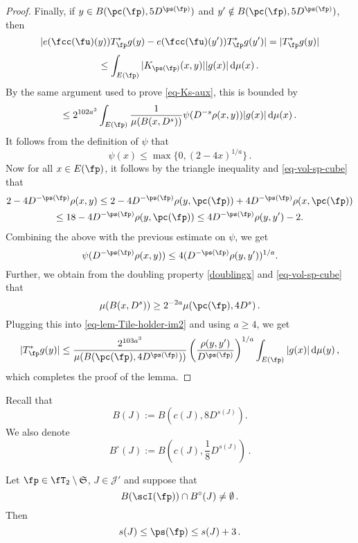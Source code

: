 \begin{proof}
        Finally, if $y \in B(\pc(\fp), 5D^{\ps(\fp)})$ and $y' \notin B(\pc(\fp), 5D^{\ps(\fp)})$, then
        $$
            |e(\fcc(\fu)(y)) T_{\fp}^* g(y) - e(\fcc(\fu)(y')) T_{\fp}^* g(y')| = |T_{\fp}^* g(y)|
        $$
        $$
            \le \int_{E(\fp)} |K_{\ps(\fp)}(x,y)| |g(x)| \, \mathrm{d}\mu(x)\,.
        $$
        By the same argument used to prove \eqref{eq-Ks-aux}, this is bounded by
        \begin{equation}
            \label{eq-lem-Tile-holder-im2}
            \le 2^{102a^3} \int_{E(\fp)} \frac{1}{\mu(B(x, D^s))} \psi(D^{-s} \rho(x,y)) |g(x)| \, \mathrm{d}\mu(x)\,.
        \end{equation}
        It follows from the definition of $\psi$ that
        $$
            \psi(x) \le \max\{0, (2 - 4x)^{1/a}\}\,.
        $$
        Now for all $x\in E(\fp)$, it follows by the triangle inequality and \eqref{eq-vol-sp-cube} that
        \begin{multline*}
        2 - 4D^{-\ps(\fp)}\rho(x,y)\leq 2 - 4D^{-\ps(\fp)}\rho(y, \pc(\fp)) + 4 D^{-\ps(\fp)}\rho(x, \pc(\fp))\\\leq 18 - 4 D^{-\ps(\fp)} \rho(y, \pc(\fp)) \leq 4 D^{-\ps(\fp)}\rho(y,y') - 2 .
        \end{multline*}
        Combining the above with the previous estimate on $\psi$, we get
        $$
            \psi(D^{-\ps(\fp)}\rho(x,y)) \le 4 (D^{-\ps(\fp)}\rho(y,y'))^{1/a}.
        $$
        Further, we obtain from the doubling property \eqref{doublingx} and \eqref{eq-vol-sp-cube} that
        $$
            \mu(B(x, D^s)) \ge 2^{-2a} \mu(\pc(\fp), 4D^s)\,.
        $$
        Plugging this into \eqref{eq-lem-Tile-holder-im2} and using $a \ge 4$, we get
        $$
            |T_{\fp}^* g(y)| \le \frac{2^{103a^3}}{\mu(B(\pc(\fp), 4D^{\ps(\fp)}))} \left(\frac{\rho(y,y')}{D^{\ps(\fp)}}\right)^{1/a} \int_{E(\fp)} |g(x)| \, \mathrm{d}\mu(y)\,,
        $$
        which completes the proof of the lemma.
    \end{proof}

    Recall that
    \begin{equation*}
        B(J) := B(c(J), 8D^{s(J)}).
    \end{equation*}
    We also denote
    \begin{equation*}
     B^\circ{}(J) := B(c(J), \frac{1}{8}D^{s(J)})\, .
    \end{equation*}


    \begin{lemma}
        \label{limited-scale-impact}
        Let $\fp \in \fT_2 \setminus \mathfrak{S}$, $J \in \mathcal{J}'$ and suppose that
        $$
           B(\scI(\fp)) \cap B^\circ(J) \ne \emptyset\,.
        $$
        Then
        $$
            s(J) \le \ps(\fp) \le s(J) +3\,.
        $$
    \end{lemma}

